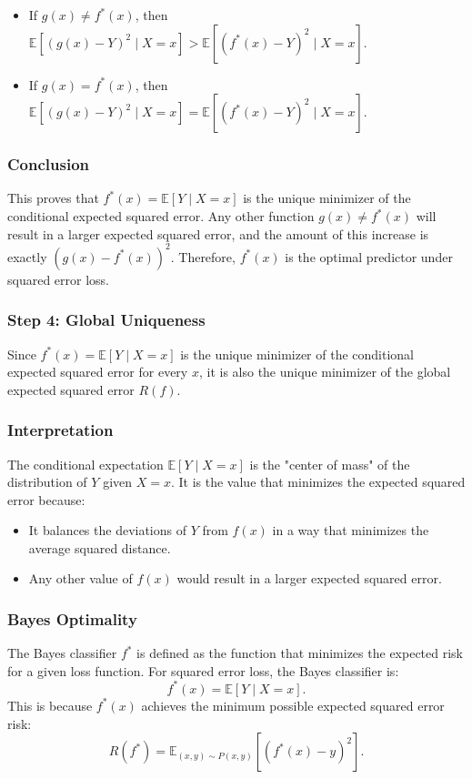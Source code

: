 \begin{notechapter}
\begin{itemize}
    \item If \( g(x) \neq f^*(x) \), then \( \mathbb{E}[(g(x) - Y)^2 \mid X = x] > \mathbb{E}[(f^*(x) - Y)^2 \mid X = x] \).
    \item If \( g(x) = f^*(x) \), then \( \mathbb{E}[(g(x) - Y)^2 \mid X = x] = \mathbb{E}[(f^*(x) - Y)^2 \mid X = x] \).
\end{itemize}

\subsubsection{Conclusion}

This proves that \( f^*(x) = \mathbb{E}[Y \mid X = x] \) is the unique minimizer of the conditional expected squared error. Any other function \( g(x) \neq f^*(x) \) will result in a larger expected squared error, and the amount of this increase is exactly \( (g(x) - f^*(x))^2 \). Therefore,
\( f^*(x) \) is the optimal predictor under squared error loss.

\subsubsection{Step 4: Global Uniqueness}
Since \( f^*(x) = \mathbb{E}[Y \mid X = x] \) is the unique minimizer of the conditional expected squared error for every \( x \), it is also the unique minimizer of the global expected squared error \( R(f) \).

\subsubsection{Interpretation}
The conditional expectation \( \mathbb{E}[Y \mid X = x] \) is the "center of mass" of the distribution of \( Y \) given \( X = x \). It is the value that minimizes the expected squared error because:
\begin{itemize}
    \item It balances the deviations of \( Y \) from \( f(x) \) in a way that minimizes the average squared distance.
    \item Any other value of \( f(x) \) would result in a larger expected squared error.
\end{itemize}

\subsubsection{Bayes Optimality}
The Bayes classifier \( f^* \) is defined as the function that minimizes the expected risk for a given loss function. For squared error loss, the Bayes classifier is:
\[
f^*(x) = \mathbb{E}[Y \mid X = x].
\]
This is because \( f^*(x) \) achieves the minimum possible expected squared error risk:
\[
R(f^*) = \mathbb{E}_{(x,y) \sim P(x,y)}[(f^*(x) - y)^2].
\]


\end{notechapter}

